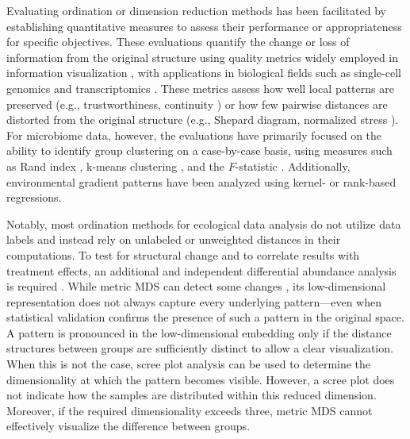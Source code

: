 \documentclass[10pt,letterpaper]{article}
\newcommand{\1}{{\rm 1}\kern-0.24em{\rm I}}
\begin{document}
Evaluating ordination or dimension reduction methods has been facilitated by establishing quantitative measures to assess their performance or appropriateness for specific objectives. 
These evaluations quantify the change or loss of information from the original structure using quality metrics widely employed in information visualization \cite{Bertini11,Gonzalez12,Espadoto21}, with applications in biological fields such as single-cell genomics \cite{Lause24} and transcriptomics \cite{Cui24, Narayan21}.
These metrics assess how well local patterns are preserved (e.g., trustworthiness, continuity \cite{Venna01}) or how few pairwise distances are distorted from the original structure (e.g., Shepard diagram, normalized stress \cite{borg05c}).
For microbiome data, however, the evaluations have primarily focused on the ability to identify group clustering on a case-by-case basis, using measures such as Rand index \cite{Shi22}, k-means clustering \cite{Kuczynski10, Wang22}, and the $F$-statistic \cite{Hawinkel19, Wang22}. Additionally, environmental gradient patterns have been analyzed using kernel- \cite{Randolph18} or rank-based \cite{Kuczynski10} regressions.

Notably, most ordination methods for ecological data analysis do not utilize data labels and instead rely on unlabeled or unweighted distances in their computations. To test for structural change and to correlate results with treatment effects, an additional and independent differential abundance analysis is required \cite{peterson24, Armstrong22}.
While metric MDS can detect some changes \cite{Borg05d}, its low-dimensional representation does not always capture every underlying pattern---even when statistical validation confirms the presence of such a pattern in the original space. A pattern is pronounced in the low-dimensional embedding only if the distance structures between groups are sufficiently distinct to allow a clear visualization. When this is not the case, scree plot analysis can be used to determine the dimensionality at which the pattern becomes visible. However, a scree plot does not indicate how the samples are distributed within this reduced dimension. Moreover, if the required dimensionality exceeds three, metric MDS cannot effectively visualize the difference between groups.
\end{document}
